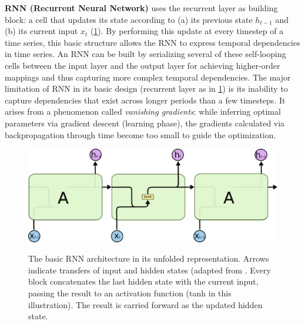 \vspace{1em}
\noindent
\textbf{RNN (Recurrent Neural Network)} uses the recurrent layer as building block: a cell that updates its state according to (a) its previous state $h_{t-1}$ and (b) its current input $x_t$ (\ref{fig:rnn}). By performing this update at every timestep of a time series, this basic structure allows the RNN to express temporal dependencies in time series. An RNN can be built by serializing several of these self-looping cells between the input layer and the output layer for achieving higher-order mappings and thus capturing more complex temporal dependencies. The major limitation of RNN in its basic design (recurrent layer as in \ref{fig:rnn}) is its inability to capture dependencies that exist across longer periods than a few timesteps. It arises from a phenomenon called \textit{vanishing gradients}: while inferring optimal parameters via gradient descent (learning phase), the gradients calculated via backpropagation through time become too small to guide the optimization.
\begin{figure}[H]
	\centering
    \caption{The basic RNN architecture in its unfolded representation. Arrows indicate transfers of input and hidden states (adapted from \cite{paneru2015lstm}. Every block concatenates the last hidden state with the current input, passing the result to an activation function (tanh in this illustration). The result is carried forward as the updated hidden state.}
    \includegraphics[scale=0.45]{rnn.png}
	\label{fig:rnn}
\end{figure}

